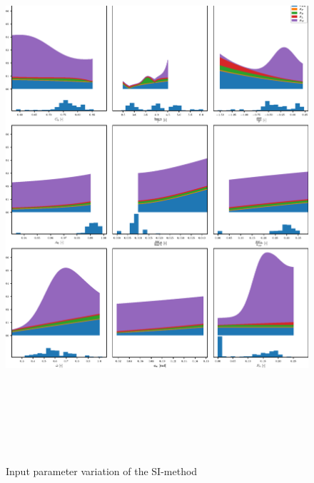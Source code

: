 \begin{figure}[H]
    \centering
    \includegraphics[width=6in, height = 8in ]{figures/SI-sensitivity.eps}
        \vspace{-0.5cm}
    \caption{Input parameter variation of the SI-method}
    \label{fig:SI_sensitivity}
\end{figure}



